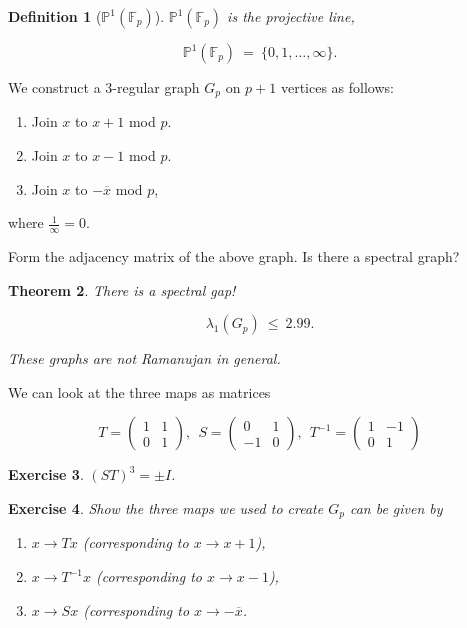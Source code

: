\documentclass[12pt,letterpaper]{report}
\newcommand\be{\begin{equation}}
\newcommand\ee{\end{equation}}
\newcommand\ben{\begin{enumerate}}
\newcommand\een{\end{enumerate}}
\newcommand{\Pone}{\ensuremath{\mathbb{P}^1}}
\newcommand{\F}{\mathbb{F}}
\newtheorem{thm}{Theorem}[section]
\newtheorem{defi}[thm]{Definition}
\newtheorem{exe}[thm]{Exercise}
\begin{document}
\begin{defi}[$\Pone(\F_p)$] $\Pone(\F_p)$ is the projective line,

\be \Pone(\F_p) \ = \ \{0,1,\dots,\infty\}. \ee
\end{defi}

We construct a $3$-regular graph $G_p$ on $p+1$ vertices as
follows:

\ben
\item Join $x$ to $x+1$ mod $p$.
\item Join $x$ to $x-1$ mod $p$.
\item Join $x$ to $-\overline{x}$ mod $p$,
\een

where $\frac{1}{\infty} = 0$.

Form the adjacency matrix of the above graph. Is there a spectral
graph?

\begin{thm} There is a spectral gap!

\be \lambda_1(G_p) \ \le \ 2.99. \ee

These graphs are \emph{not} Ramanujan in general.
\end{thm}

We can look at the three maps as matrices

\be T = \left(\begin{array}{cc}
                        1 &  1  \\
                        0   & 1
                          \end{array}\right), \ \
S = \left(\begin{array}{cc}
                        0 &  1  \\
                        -1   & 0
                          \end{array}\right), \ \
 T^{-1} = \left(\begin{array}{cc}
                        1 &  -1  \\
                        0   & 1
                          \end{array}\right)
\ee



\begin{exe} $(ST)^3 = \pm I$. \end{exe}

\begin{exe} Show the three maps we used to create $G_p$ can be
given by

\ben
\item $x \to Tx$ (corresponding to $x \to x+1$),
\item $x \to T^{-1} x$ (corresponding to $x \to x-1$),
\item $x \to Sx$ (corresponding to $x \to -\overline{x}$.
\een
\end{exe}
\end{document}
